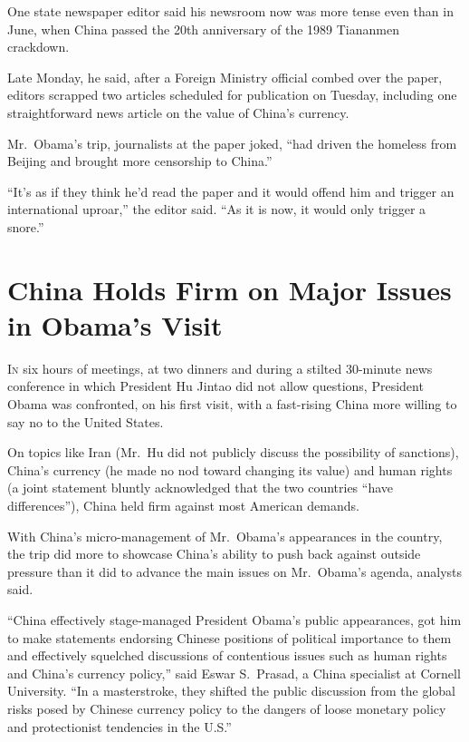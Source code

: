 ﻿\documentclass[12pt]{article}
\begin{document}
One state newspaper editor said his newsroom now was more tense even than in June, when China passed
the 20th anniversary of the 1989 Tiananmen crackdown.

Late Monday, he said, after a Foreign Ministry official combed over the paper, editors scrapped two
articles scheduled for publication on Tuesday, including one straightforward news article on the
value of China's currency.

Mr.~Obama's trip, journalists at the paper joked, ``had driven the homeless from Beijing and brought
more censorship to China.''

``It's as if they think he'd read the paper and it would offend him and trigger an international
uproar,'' the editor said. ``As it is now, it would only trigger a snore.''


\section{China Holds Firm on Major Issues in Obama's Visit}

\lettrine{I}{n} six hours of meetings, at two dinners and during a stilted
30-minute news conference in which President Hu Jintao did not allow questions, President Obama was
confronted, on his first visit, with a fast-rising China more willing to say no to the United
States.

On topics like Iran (Mr.~Hu did not publicly discuss the possibility of sanctions), China's currency
(he made no nod toward changing its value) and human rights (a joint statement bluntly acknowledged
that the two countries ``have differences''), China held firm against most American demands.

With China's micro-management of Mr.~Obama's appearances in the country, the trip did more to
showcase China's ability to push back against outside pressure than it did to advance the main
issues on Mr.~Obama's agenda, analysts said.

``China effectively stage-managed President Obama's public appearances, got him to make statements
endorsing Chinese positions of political importance to them and effectively squelched discussions of
contentious issues such as human rights and China's currency policy,'' said Eswar S.~Prasad, a China
specialist at Cornell University. ``In a masterstroke, they shifted the public discussion from the
global risks posed by Chinese currency policy to the dangers of loose monetary policy and
protectionist tendencies in the U.S.''
\end{document}
